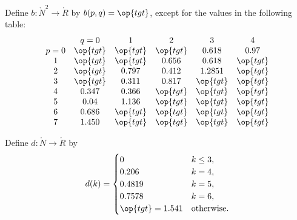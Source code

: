 \begin{definition}[b]
Define $b:\ring{N}^2\to \ring{R}$ by $b(p,q)=\op{tgt}$,
except for the values in the following table:
{
\def\tx{\op{tgt}}
\[ \begin{matrix}  &q=0&1&2&3&4\\
p=0&\tx&\tx&\tx&0.618&0.97\\
1&\tx&\tx&0.656&0.618&\tx\\
2&\tx&0.797&0.412&1.2851&\tx\\
3&\tx&0.311&0.817&\tx&\tx\\
4&0.347&0.366&\tx&\tx&\tx\\
5&0.04&1.136&\tx&\tx&\tx\\
6&0.686&\tx&\tx&\tx&\tx\\
7&1.450&\tx&\tx&\tx&\tx
\end{matrix}
\] 
}
%
\end{definition}


\begin{definition}[d]
Define $d:\ring{N}\to \ring{R}$ by
\[ d(k) = \begin{cases}
0 & k\le3, \\
0.206 & k=4, \\
0.4819 & k=5, \\
0.7578 & k=6, \\
\op{tgt}=1.541 & \text{otherwise}.
\end{cases}
\] 
%
\end{definition}




